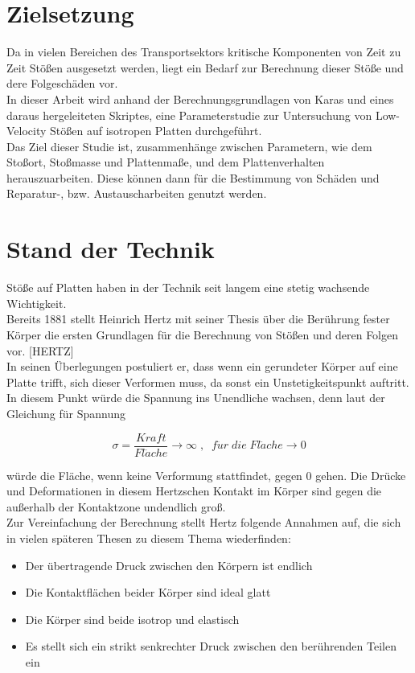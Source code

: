 \section{Zielsetzung}
Da in vielen Bereichen des Transportsektors kritische Komponenten von Zeit zu
Zeit Stößen ausgesetzt werden, liegt ein Bedarf zur Berechnung dieser Stöße und
dere Folgeschäden vor. \\
In dieser Arbeit wird anhand der Berechnungsgrundlagen von Karas und eines
daraus hergeleiteten Skriptes, eine Parameterstudie zur Untersuchung von
Low-Velocity Stößen auf isotropen Platten durchgeführt. \\
Das Ziel dieser Studie ist, zusammenhänge zwischen Parametern, wie dem Stoßort,
Stoßmasse und Plattenmaße, und dem Plattenverhalten herauszuarbeiten. Diese
können dann für die Bestimmung von Schäden und Reparatur-, bzw.
Austauscharbeiten genutzt werden.\\

\section{Stand der Technik}

Stöße auf Platten haben in der Technik seit langem eine stetig wachsende
Wichtigkeit. \\
Bereits 1881 stellt Heinrich Hertz mit seiner Thesis über die Berührung fester
Körper die ersten Grundlagen für die Berechnung von Stößen und deren Folgen vor.
[HERTZ] \\
In seinen Überlegungen postuliert er, dass wenn ein gerundeter Körper auf eine
Platte trifft, sich dieser Verformen muss, da sonst ein Unstetigkeitspunkt
auftritt. In diesem Punkt würde die Spannung ins Unendliche wachsen, denn laut
der Gleichung für Spannung 

\begin{equation}
\sigma = \frac{Kraft}{Fl\ddot{a}che} \rightarrow \infty \; , \; \; f\ddot{u}r \;
die \; Fl\ddot{a}che \rightarrow 0
\end{equation}

würde die Fläche, wenn keine Verformung stattfindet, gegen 0 gehen. Die Drücke
und Deformationen in diesem Hertzschen Kontakt im Körper sind gegen die
außerhalb der Kontaktzone undendlich groß. \\
Zur Vereinfachung der Berechnung stellt Hertz folgende Annahmen auf, die sich in
vielen späteren Thesen zu diesem Thema wiederfinden: 
\begin{itemize}
	\item Der übertragende Druck zwischen den Körpern ist endlich
	\item Die Kontaktflächen beider Körper sind ideal glatt
	\item Die Körper sind beide isotrop und elastisch
	\item Es stellt sich ein strikt senkrechter Druck zwischen den berührenden Teilen ein
\end{itemize}

